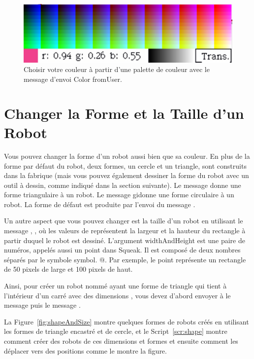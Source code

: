 \documentclass[a4paper,10pt,twoside]{book}
\begin{document}
\begin{figure}[h]
	\centerline{\includegraphics{colorFromUser}}
	\caption{Choisir votre couleur \`a partir d'une palette de couleur avec le message d'envoi Color fromUser. 
	\label{fig:palette}}
\end{figure}

\section{Changer la Forme et la Taille d'un Robot}

Vous pouvez changer la forme d'un robot aussi bien que sa couleur. En plus de la forme par d\'efaut 
du robot, deux formes, un cercle et un triangle, sont construits dans la fabrique  (mais 
vous pouvez \'egalement dessiner la forme du robot avec un outil \`a dessin, comme indiqu\'e dans la 
section suivante). Le message  donne une forme triangulaire \`a un robot. Le 
message  gidonne une forme circulaire \`a un robot. La forme de d\'efaut est produite 
par l'envoi du message . 

Un autre aspect que vous pouvez changer est la taille d'un robot en utilisant le message , 
, où les valeurs de  repr\'esentent la largeur et la hauteur du rectangle \`a 
partir duquel le robot est dessin\'e. L'argument widthAndHeight est une paire de 
num\'eros, appel\'es aussi un point dans Squeak. Il est compos\'e de deux nombres s\'epar\'es par le symbole 
 symbol. @. Par exemple, le point  repr\'esente un rectangle de 50 pixels de large et 
100 pixels de haut.

Ainsi, pour cr\'eer un robot nomm\'e  ayant une forme de triangle qui tient \`a l'int\'erieur 
d'un carr\'e avec des dimensions , vous devez d'abord envoyer \`a le message 
 puis le message . 

La Figure~\ref{fig:shapeAndSize} montre quelques formes de robots cr\'e\'es en utilisant les formes 
de triangle encastr\'e et de cercle, et le Script~\ref{scr:shape} montre comment cr\'eer des robots de 
ces dimensions et formes et ensuite comment les d\'eplacer vers des positions comme le montre la figure.
\end{document}
